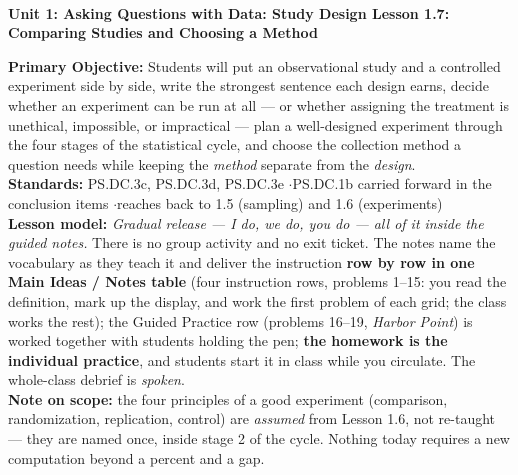 \documentclass[10pt]{article}
\newcommand{\UnitNumberName}{Unit 1: Asking Questions with Data: Study Design \quad}
\newcommand{\LessonNumberName}{Lesson 1.7: Comparing Studies and Choosing a Method}
\begin{document}
\begin{center}
    {\Large\bfseries \CourseName \\
    {\small\bfseries \UnitNumberName \LessonNumberName}}
\end{center}

\begin{tcolorbox}[colback=frost, colframe=cerulean, boxrule=0.9pt, arc=2mm,
    left=2mm, right=2mm, top=1.5mm, bottom=1.5mm]
    \textbf{Primary Objective:} Students will put an observational study and a controlled
    experiment side by side, write the strongest sentence each design earns, decide whether an
    experiment can be run at all --- or whether assigning the treatment is unethical,
    impossible, or impractical --- plan a well-designed experiment through the four stages of
    the statistical cycle, and choose the collection method a question needs while keeping the
    \emph{method} separate from the \emph{design}.
    \\[2pt]
    \textbf{Standards:} PS.DC.3c, PS.DC.3d, PS.DC.3e \quad$\cdot$\quad PS.DC.1b carried forward
    in the conclusion items \quad$\cdot$\quad reaches back to 1.5 (sampling) and 1.6
    (experiments)
    \\[2pt]
    \textbf{Lesson model:} \emph{Gradual release --- I do, we do, you do --- all of it inside
    the guided notes.} There is no group activity and no exit ticket. The notes name the
    vocabulary as they teach it and deliver the instruction \textbf{row by row in one Main
    Ideas / Notes table} (four instruction rows, problems 1--15: you read the definition, mark
    up the display, and work the first problem of each grid; the class works the rest); the
    Guided Practice row (problems 16--19, \emph{Harbor Point}) is worked together with students
    holding the pen; \textbf{the homework is the individual practice}, and students start it in
    class while you circulate. The whole-class debrief is \emph{spoken}.
    \\[2pt]
    \textbf{Note on scope:} the four principles of a good experiment (comparison, randomization,
    replication, control) are \emph{assumed} from Lesson 1.6, not re-taught --- they are named
    once, inside stage 2 of the cycle. Nothing today requires a new computation beyond a percent
    and a gap.
\end{tcolorbox}
\end{document}
